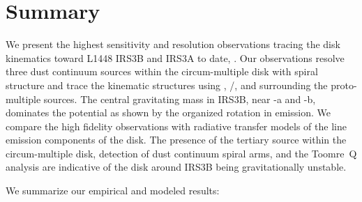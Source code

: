 \documentclass[twocolumn, 12pt, trackchanges]{aastex63}
\begin{document}
\section{Summary}
We present the highest sensitivity and resolution observations tracing the disk kinematics toward L1448 IRS3B and IRS3A to date, . Our observations resolve three dust continuum sources within the circum-multiple disk with spiral structure and trace the kinematic structures using \cso, \htcn/\sot, and \htcop\space surrounding the proto-multiple sources. The central gravitating mass in IRS3B, near -a and -b, dominates the potential as shown by the organized rotation in \cso\space emission. We compare the high fidelity observations with radiative transfer models of the line emission components of the disk. The presence of the tertiary source within the circum-multiple disk, detection of dust continuum spiral arms, and the Toomre~Q analysis are indicative of the disk around IRS3B being gravitationally unstable.


We summarize our empirical and modeled results:
\end{document}
